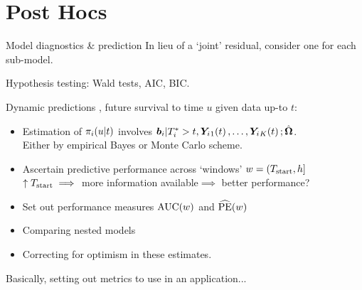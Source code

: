 \documentclass[10pt]{beamer}
\begin{document}
\section{Post Hocs}
\begin{frame}{Model diagnostics \& prediction}
    In lieu of a `joint' residual, consider one for each sub-model.\\

    \vspace{5mm}

    Hypothesis testing: Wald tests, AIC, BIC.\\

    \vspace{5mm}

    Dynamic predictions \cite{Rizopoulos2011}, future survival to time $u$ given data up-to $t$:
    \vspace{1mm}
    \begin{itemize}
        \item Estimation of $\pi_i\!\left( u|t\right)$ involves $\bm{b}_i|T_i^*>t,\bm{Y}_i{_1}\!\left( t\right),\ldots,\bm{Y}_i{_K}\!\left( t\right); \hat{\bm{\Omega}}$.\\Either by empirical Bayes or Monte Carlo scheme.
        \vspace{1mm}
        \item Ascertain predictive performance across `windows' $w=(T_{\mathrm{start}},h]$\\
        $\uparrow T_{\mathrm{start}}\implies$ more information available$\implies$ better performance?
        \vspace{1mm}
        \item Set out performance measures $\mathrm{AUC}\!\left( w\right)$ and $\widehat{\mathrm{PE}}\!\left( w\right)$
        \vspace{1mm}
        \item Comparing nested models
        \vspace{1mm}
        \item Correcting for optimism in these estimates.
    \end{itemize}

    \vspace{5mm}

    Basically, setting out metrics to use in an application...
    
\end{frame}
\end{document}
